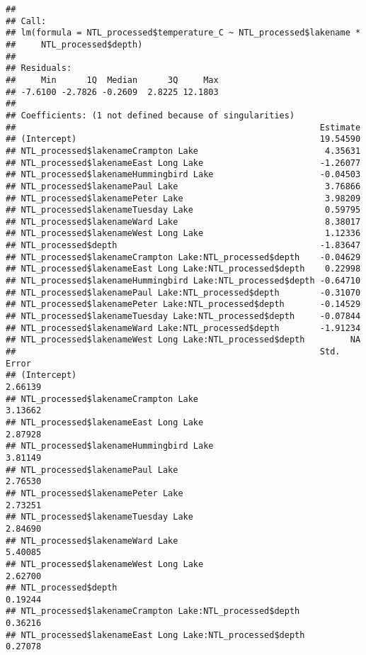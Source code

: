 \documentclass[]{article}
\begin{document}
\begin{verbatim}
## 
## Call:
## lm(formula = NTL_processed$temperature_C ~ NTL_processed$lakename * 
##     NTL_processed$depth)
## 
## Residuals:
##     Min      1Q  Median      3Q     Max 
## -7.6100 -2.7826 -0.2609  2.8225 12.1803 
## 
## Coefficients: (1 not defined because of singularities)
##                                                            Estimate
## (Intercept)                                                19.54590
## NTL_processed$lakenameCrampton Lake                         4.35631
## NTL_processed$lakenameEast Long Lake                       -1.26077
## NTL_processed$lakenameHummingbird Lake                     -0.04503
## NTL_processed$lakenamePaul Lake                             3.76866
## NTL_processed$lakenamePeter Lake                            3.98209
## NTL_processed$lakenameTuesday Lake                          0.59795
## NTL_processed$lakenameWard Lake                             8.38017
## NTL_processed$lakenameWest Long Lake                        1.12336
## NTL_processed$depth                                        -1.83647
## NTL_processed$lakenameCrampton Lake:NTL_processed$depth    -0.04629
## NTL_processed$lakenameEast Long Lake:NTL_processed$depth    0.22998
## NTL_processed$lakenameHummingbird Lake:NTL_processed$depth -0.64710
## NTL_processed$lakenamePaul Lake:NTL_processed$depth        -0.31070
## NTL_processed$lakenamePeter Lake:NTL_processed$depth       -0.14529
## NTL_processed$lakenameTuesday Lake:NTL_processed$depth     -0.07844
## NTL_processed$lakenameWard Lake:NTL_processed$depth        -1.91234
## NTL_processed$lakenameWest Long Lake:NTL_processed$depth         NA
##                                                            Std. Error
## (Intercept)                                                   2.66139
## NTL_processed$lakenameCrampton Lake                           3.13662
## NTL_processed$lakenameEast Long Lake                          2.87928
## NTL_processed$lakenameHummingbird Lake                        3.81149
## NTL_processed$lakenamePaul Lake                               2.76530
## NTL_processed$lakenamePeter Lake                              2.73251
## NTL_processed$lakenameTuesday Lake                            2.84690
## NTL_processed$lakenameWard Lake                               5.40085
## NTL_processed$lakenameWest Long Lake                          2.62700
## NTL_processed$depth                                           0.19244
## NTL_processed$lakenameCrampton Lake:NTL_processed$depth       0.36216
## NTL_processed$lakenameEast Long Lake:NTL_processed$depth      0.27078

\end{verbatim}
\end{document}
